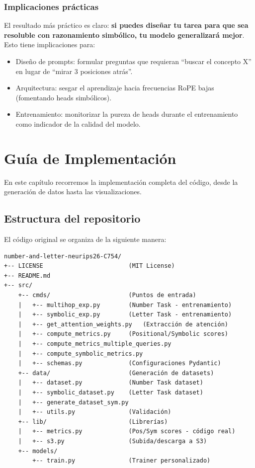 \documentclass[12pt,a4paper,oneside]{report}
\begin{document}
\subsection{Implicaciones prácticas}

El resultado más práctico es claro: \textbf{si puedes diseñar tu tarea para que sea resoluble con razonamiento simbólico, tu modelo generalizará mejor}. Esto tiene implicaciones para:
\begin{itemize}
    \item Diseño de prompts: formular preguntas que requieran ``buscar el concepto X'' en lugar de ``mirar 3 posiciones atrás''.
    \item Arquitectura: sesgar el aprendizaje hacia frecuencias RoPE bajas (fomentando heads simbólicos).
    \item Entrenamiento: monitorizar la pureza de heads durante el entrenamiento como indicador de la calidad del modelo.
\end{itemize}

\chapter{Guía de Implementación}

En este capítulo recorremos la implementación completa del código, desde la generación de datos hasta las visualizaciones.

\section{Estructura del repositorio}

El código original se organiza de la siguiente manera:

\begin{verbatim}
number-and-letter-neurips26-C754/
+-- LICENSE                        (MIT License)
+-- README.md
+-- src/
    +-- cmds/                      (Puntos de entrada)
    |   +-- multihop_exp.py        (Number Task - entrenamiento)
    |   +-- symbolic_exp.py        (Letter Task - entrenamiento)
    |   +-- get_attention_weights.py   (Extracción de atención)
    |   +-- compute_metrics.py     (Positional/Symbolic scores)
    |   +-- compute_metrics_multiple_queries.py
    |   +-- compute_symbolic_metrics.py
    |   +-- schemas.py             (Configuraciones Pydantic)
    +-- data/                      (Generación de datasets)
    |   +-- dataset.py             (Number Task dataset)
    |   +-- symbolic_dataset.py    (Letter Task dataset)
    |   +-- generate_dataset_sym.py
    |   +-- utils.py               (Validación)
    +-- lib/                       (Librerías)
    |   +-- metrics.py             (Pos/Sym scores - código real)
    |   +-- s3.py                  (Subida/descarga a S3)
    +-- models/
        +-- train.py               (Trainer personalizado)
\end{verbatim}
\end{document}
